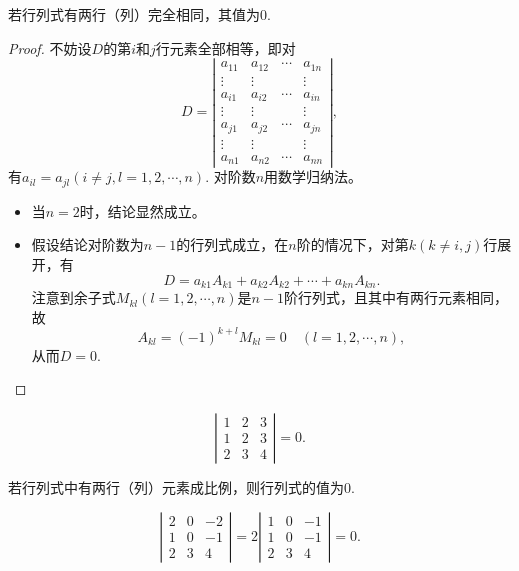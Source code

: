 \begin{xingzhi}
  若行列式有两行（列）完全相同，其值为$0$.
\end{xingzhi}
\begin{proof}
  不妨设$D$的第$i$和$j$行元素全部相等，即对
  $$
  D = \left|
    \begin{array}{cccc}
      a_{11}  &  a_{12} & \cdots & a_{1n} \\
      \vdots & \vdots &  & \vdots\\  
      a_{i1}  &  a_{i2} & \cdots & a_{in} \\
      \vdots & \vdots &  & \vdots\\  
      a_{j1}  &  a_{j2} & \cdots & a_{jn} \\
      \vdots & \vdots &  & \vdots\\  
      a_{n1}  &  a_{n2} & \cdots & a_{nn} 
    \end{array}
  \right|,
  $$
  有$a_{il}=a_{jl}(i\ne j, l=1,2,\cdots,n)$.
  对阶数$n$用数学归纳法。
  \begin{itemize}
  \item 当$n=2$时，结论显然成立。
  \item 假设结论对阶数为$n-1$的行列式成立，在$n$阶的情况下，对第$k(k\ne i, j)$行展开，有
    $$
    D = a_{k1} A_{k1} + a_{k2} A_{k2} + \cdots + a_{kn} A_{kn}. 
    $$ 
    注意到余子式$M_{kl}(l=1,2,\cdots,n)$是$n-1$阶行列式，且其中有两行元素相同，故
    $$
    A_{kl} = (-1)^{k+l} M_{kl} = 0\quad (l=1,2,\cdots,n),
    $$
    从而$D=0$.
  \end{itemize}
\end{proof}
\begin{li}
  $$
  \left|
    \begin{array}{ccc}
      1 & 2 & 3\\
      1 & 2 & 3\\
      2 & 3 & 4
    \end{array}
  \right| = 0.
  $$
\end{li}

\begin{tuilun}
  若行列式中有两行（列）元素成比例，则行列式的值为$0$.
\end{tuilun}
\begin{li}
  $$
  \left|
    \begin{array}{ccc}
      2 & 0 & -2\\
      1 & 0 & -1\\
      2 & 3 & 4
    \end{array}
  \right| =2 \left|
    \begin{array}{ccc}
      1 & 0 & -1\\
      1 & 0 & -1\\
      2 & 3 & 4
    \end{array}
  \right| = 0.
  $$
\end{li}


